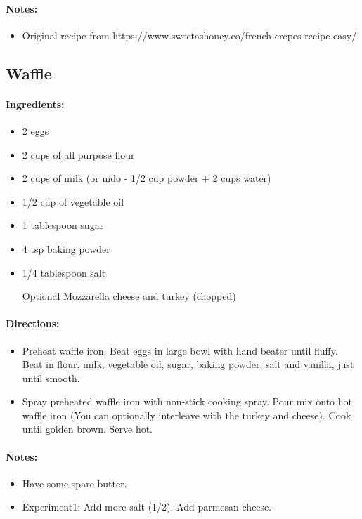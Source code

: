 \documentclass{article}
\begin{document}
\paragraph{Notes:}
\begin{itemize}
    \item Original recipe from https://www.sweetashoney.co/french-crepes-recipe-easy/
\end{itemize}

\subsection{Waffle}

\paragraph{Ingredients:}
\begin{itemize}
    \item 2 eggs
    \item 2 cups of all purpose flour
    \item 2 cups of milk (or nido - 1/2 cup powder + 2 cups water)
    \item 1/2 cup of vegetable oil
    \item 1 tablespoon sugar
    \item 4 tsp baking powder
    \item 1/4 tablespoon salt
    \item [Optional] Mozzarella cheese and turkey (chopped)
\end{itemize}

\paragraph{Directions:}
\begin{itemize}
    \item Preheat waffle iron. Beat eggs in large bowl with hand beater until fluffy. Beat in flour, milk, vegetable oil, sugar, baking powder, salt and vanilla, just until smooth.
    \item Spray preheated waffle iron with non-stick cooking spray. Pour mix onto hot waffle iron (You can optionally interleave with the turkey and cheese). Cook until golden brown. Serve hot.
\end{itemize}

\paragraph{Notes:}
\begin{itemize}
    \item Have some spare butter.
    \item Experiment1: Add more salt (1/2). Add parmesan cheese.
\end{itemize}
\end{document}
